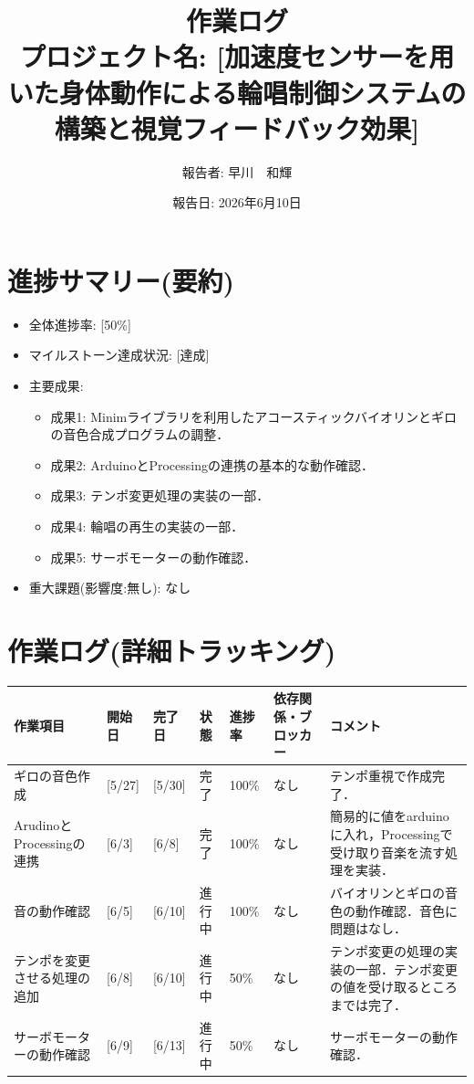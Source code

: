 \documentclass[uplatex,dvipdfmx]{jlreq}
\title{作業ログ\\ \large プロジェクト名: [加速度センサーを用いた身体動作による輪唱制御システムの構築と視覚フィードバック効果]}
\author{報告者: 早川　和輝}
\date{報告日: 2026年6月10日}
\begin{document}
\maketitle

\section{進捗サマリー(要約)}
\begin{itemize}
    \item 全体進捗率: [50\%]
    \item マイルストーン達成状況: [達成]
    \item 主要成果:
    \begin{itemize}
        \item 成果1: Minimライブラリを利用したアコースティックバイオリンとギロの音色合成プログラムの調整．
        \item 成果2: ArduinoとProcessingの連携の基本的な動作確認．
        \item 成果3: テンポ変更処理の実装の一部．
        \item 成果4: 輪唱の再生の実装の一部．
        \item 成果5: サーボモーターの動作確認．
    \end{itemize}
    \item 重大課題(影響度:無し): なし
\end{itemize}
\section{作業ログ(詳細トラッキング)}
\begin{table}[H]
    \centering
    \small
    \begin{tabular}{lp{1.5cm}p{1.5cm}llp{2.5cm}p{3cm}}
        \toprule
        作業項目 & 開始日 & 完了日 & 状態 & 進捗率 & 依存関係・ブロッカー & コメント \\
        \midrule
        ギロの音色作成& [5/27] & [5/30] & 完了 & 100\% & なし & テンポ重視で作成完了． \\
        ArudinoとProcessingの連携 & [6/3] & [6/8] & 完了 & 100\% & なし & 簡易的に値をarduinoに入れ，Processingで受け取り音楽を流す処理を実装． \\
        音の動作確認 & [6/5] & [6/10] & 進行中 & 100\% & なし & バイオリンとギロの音色の動作確認．音色に問題はなし．\\
        テンポを変更させる処理の追加 & [6/8] & [6/10] & 進行中 & 50\% & なし & テンポ変更の処理の実装の一部．テンポ変更の値を受け取るところまでは完了． \\
        サーボモーターの動作確認 & [6/9] & [6/13] & 進行中 & 50\% & なし & サーボモーターの動作確認． \\
        \bottomrule
    \end{tabular}
\end{table}
\end{document}
